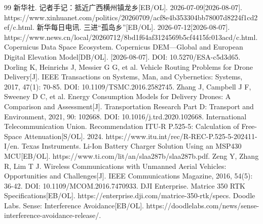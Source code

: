 \documentclass[bwprint]{gmcmthesis}
\begin{document}













\begin{thebibliography}{99}
 新华社. 记者手记：抵近广西横州镇龙乡[EB/OL]. 2026-07-09[2026-08-07]. https://www.xinhuanet.com/politics/20260709/acf8e4b353304bb78007d8224f1cd2ef/c.html.
 新华每日电讯. 三进``孤岛乡''[EB/OL]. 2026-07-12[2026-08-07]. https://www.news.cn/local/20260712/8bd1f64af3124569b5cf4415fc013acd/c.html.
 Copernicus Data Space Ecosystem. Copernicus DEM---Global and European Digital Elevation Model[DB/OL]. [2026-08-07]. DOI: 10.5270/ESA-c5d3d65.
 Dorling K, Heinrichs J, Messier G G, et al. Vehicle Routing Problems for Drone Delivery[J]. IEEE Transactions on Systems, Man, and Cybernetics: Systems, 2017, 47(1): 70-85. DOI: 10.1109/TSMC.2016.2582745.
 Zhang J, Campbell J F, Sweeney D C, et al. Energy Consumption Models for Delivery Drones: A Comparison and Assessment[J]. Transportation Research Part D: Transport and Environment, 2021, 90: 102668. DOI: 10.1016/j.trd.2020.102668.
 International Telecommunication Union. Recommendation ITU-R P.525-5: Calculation of Free-Space Attenuation[S/OL]. 2024. https://www.itu.int/rec/R-REC-P.525-5-202411-I/en.
 Texas Instruments. Li-Ion Battery Charger Solution Using an MSP430 MCU[EB/OL]. https://www.ti.com/lit/an/slaa287b/slaa287b.pdf.
 Zeng Y, Zhang R, Lim T J. Wireless Communications with Unmanned Aerial Vehicles: Opportunities and Challenges[J]. IEEE Communications Magazine, 2016, 54(5): 36-42. DOI: 10.1109/MCOM.2016.7470933.
 DJI Enterprise. Matrice 350 RTK Specifications[EB/OL]. https://enterprise.dji.com/matrice-350-rtk/specs.
 Doodle Labs. Sense: Interference Avoidance[EB/OL]. https://doodlelabs.com/news/sense-interference-avoidance-release/.
\end{thebibliography}

\begin{appendices}


\end{appendices}
\end{document}
